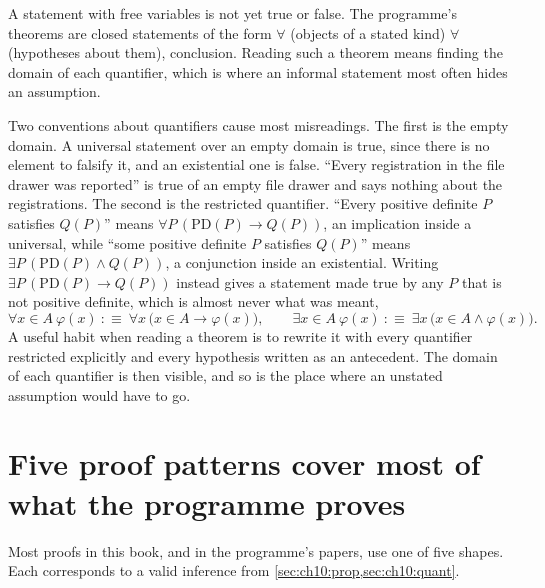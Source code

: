 A statement with free variables is not yet true or false. The programme's theorems are closed statements of the form $\forall$ (objects of a stated kind) $\forall$ (hypotheses about them), conclusion. Reading such a theorem means finding the domain of each quantifier, which is where an informal statement most often hides an assumption.

Two conventions about quantifiers cause most misreadings. The first is the empty domain. A universal statement over an empty domain is true, since there is no element to falsify it, and an existential one is false. ``Every registration in the file drawer was reported'' is true of an empty file drawer and says nothing about the registrations. The second is the restricted quantifier. ``Every positive definite $P$ satisfies $Q(P)$'' means $\forall P\,(\mathrm{PD}(P)\to Q(P))$, an implication inside a universal, while ``some positive definite $P$ satisfies $Q(P)$'' means $\exists P\,(\mathrm{PD}(P)\wedge Q(P))$, a conjunction inside an existential. Writing $\exists P\,(\mathrm{PD}(P)\to Q(P))$ instead gives a statement made true by any $P$ that is not positive definite, which is almost never what was meant,
\begin{equation}
\forall x\in A\ \varphi(x)\ :\equiv\ \forall x\,\big(x\in A\to\varphi(x)\big),\qquad \exists x\in A\ \varphi(x)\ :\equiv\ \exists x\,\big(x\in A\wedge\varphi(x)\big).
\label{eq:ch10:restricted}
\end{equation}
A useful habit when reading a theorem is to rewrite it with every quantifier restricted explicitly and every hypothesis written as an antecedent. The domain of each quantifier is then visible, and so is the place where an unstated assumption would have to go.


\section{Five proof patterns cover most of what the programme proves}\label{sec:ch10:patterns}

Most proofs in this book, and in the programme's papers, use one of five shapes. Each corresponds to a valid inference from \cref{sec:ch10:prop,sec:ch10:quant}.

